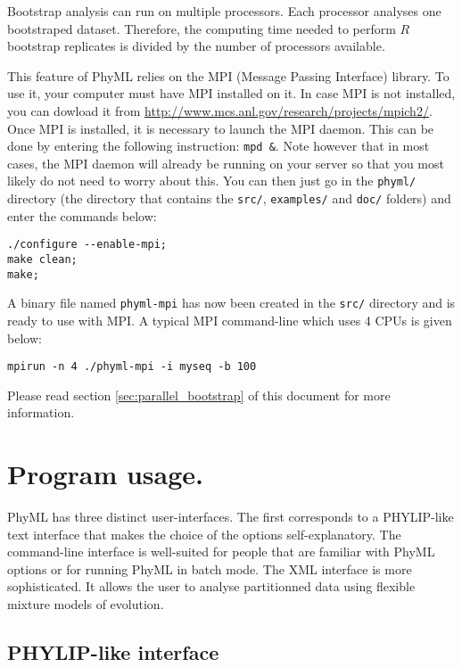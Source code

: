 \documentclass[a4paper,12pt]{article}
\newcommand{\x}[1]{\texttt{#1}}
\begin{document}
Bootstrap analysis can run on multiple  processors. Each processor analyses one bootstraped dataset.
Therefore, the computing time needed to perform $R$ bootstrap replicates is divided by the number of
processors available.

This  feature of  PhyML relies  on the  MPI (Message  Passing Interface)  library. To  use  it, your
computer must  have MPI  installed on  it. In case  MPI is  not installed, you  can dowload  it from
\href{http://www.mcs.anl.gov/research/projects/mpich2/}{http://www.mcs.anl.gov/research/projects/mpich2/}.
Once MPI is  installed, it is necessary to launch  the MPI daemon. This can be  done by entering the
following instruction: \x{mpd \&}.  Note however that in most cases, the  MPI daemon will already be
running on your server so  that you most likely do not need to worry  about this. You can then just
go in the \x{phyml/} directory (the directory that contains the \x{src/}, \x{examples/} and \x{doc/}
folders) and enter the commands below: 

{\setlength{\baselineskip}{0.5\baselineskip}
\begin{verbatim}
./configure --enable-mpi;
make clean;
make;
\end{verbatim}
}

A binary file named \x{phyml-mpi} has now been created in the \x{src/} directory and is ready to use
with MPI. A typical MPI command-line which uses 4 CPUs is given below:

{\setlength{\baselineskip}{0.5\baselineskip}
\begin{verbatim}
mpirun -n 4 ./phyml-mpi -i myseq -b 100
\end{verbatim}
}

\noindent Please read section \ref{sec:parallel_bootstrap} of this document for more information.

\section{Program usage.}\label{sec:phyml_new}

PhyML has  three distinct user-interfaces.   The first corresponds  to a PHYLIP-like  text interface
that makes the choice of the options self-explanatory. The command-line interface is well-suited for
people that are familiar with PhyML options or for running PhyML in batch mode. The XML interface is
more sophisticated. It allows the user to analyse partitionned data using flexible mixture models of evolution.

\subsection{PHYLIP-like interface}
\end{document}
